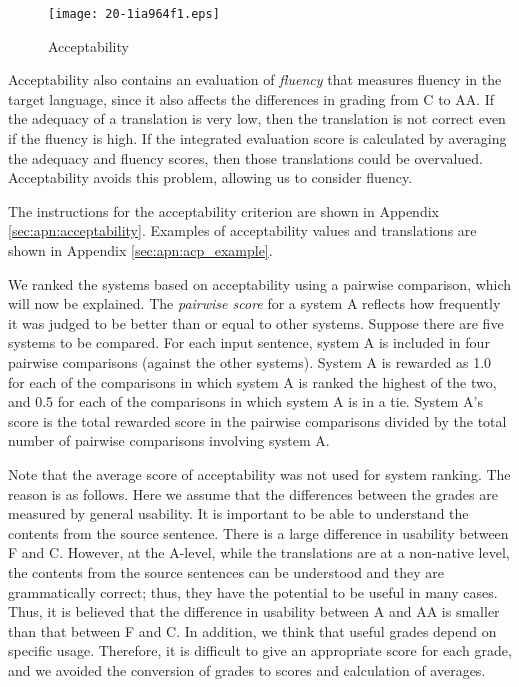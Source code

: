 \documentclass[english]{jnlp_1.4}
\begin{document}
\begin{figure}[b]
\begin{center}
\texttt{[image: 20-1ia964f1.eps]}
\end{center}
\caption{Acceptability}
\label{fig:acceptability_criterion}
\end{figure}

Acceptability also contains an evaluation of \textit{fluency} that measures fluency in the target language, since it also affects the differences in grading from C to AA. 
If the adequacy of a translation is very low, then the translation is not correct even if the fluency is high. 
If the integrated evaluation score is calculated by averaging the adequacy and fluency scores, then those translations could be overvalued. 
Acceptability avoids this problem, allowing us to consider fluency.

The instructions for the acceptability criterion are shown in Appendix \ref{sec:apn:acceptability}.
Examples of acceptability values and translations are shown in Appendix \ref{sec:apn:acp_example}.

We ranked the systems based on acceptability using a pairwise comparison, which will now be explained. 
The \textit{pairwise score} for a system A reflects how frequently it was judged to be better than or equal to other systems. 
Suppose there are five systems to be compared. 
For each input sentence, system A is included in four pairwise comparisons (against the other systems). 
System A is rewarded as 1.0 for each of the comparisons in which system A is ranked the highest of the two, and 
0.5 for each of the comparisons in which system A is in a tie. 
System A's score is the total rewarded score in the pairwise comparisons divided by the total number of pairwise comparisons involving system A.

Note that the average score of acceptability was not used for system ranking. 
The reason is as follows. 
Here we assume that the differences between the grades are measured by general usability. 
It is important to be able to understand the contents from the source sentence. 
There is a large difference in usability between F and C. 
However, at the A-level, while the translations are at a non-native level, the contents from the source sentences can be understood and they are grammatically correct; thus, they have the potential to be useful in many cases. 
Thus, it is believed that the difference in usability between A and AA is smaller than that between F and C. 
In addition, we think that useful grades depend on specific usage. 
Therefore, it is difficult to give an appropriate score for each grade, and we avoided the conversion of grades to scores and calculation of averages.
\end{document}
